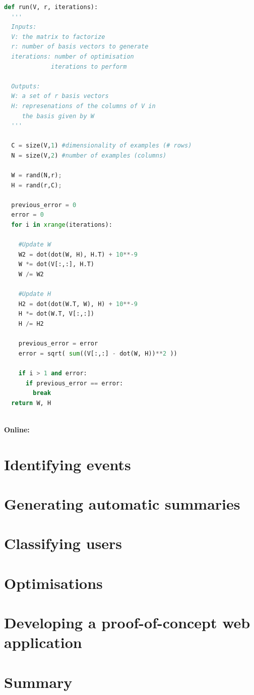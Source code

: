 \begin{lstlisting}[language=Python, label=NmfClustererSnippet, caption=Pseudocode for the NMF algorithm]
def run(V, r, iterations):
  '''
  Inputs: 
  V: the matrix to factorize
  r: number of basis vectors to generate
  iterations: number of optimisation
             iterations to perform
  
  Outputs:
  W: a set of r basis vectors
  H: represenations of the columns of V in 
     the basis given by W
  '''
  
  C = size(V,1) #dimensionality of examples (# rows)
  N = size(V,2) #number of examples (columns)

  W = rand(N,r);
  H = rand(r,C);
  
  previous_error = 0
  error = 0
  for i in xrange(iterations):

    #Update W
    W2 = dot(dot(W, H), H.T) + 10**-9
    W *= dot(V[:,:], H.T)
    W /= W2
    
    #Update H
    H2 = dot(dot(W.T, W), H) + 10**-9
    H *= dot(W.T, V[:,:])
    H /= H2                                     
    
    previous_error = error
    error = sqrt( sum((V[:,:] - dot(W, H))**2 ))
    
    if i > 1 and error:
      if previous_error == error:
        break
  return W, H
  
\end{lstlisting}

\textbf{Online:} 

\section{Identifying events}

\section{Generating automatic summaries}

\section{Classifying users}

\section{Optimisations}

\section{Developing a proof-of-concept web application}\label{WebApp}

\section{Summary}



